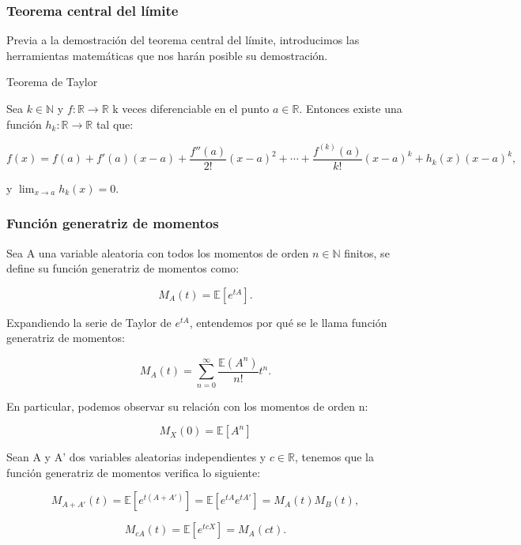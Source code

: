 \documentclass[../proyecto.tex]{memoir}
\begin{document}




\subsubsection{Teorema central del límite}

Previa a la demostración del teorema central del límite, introducimos las herramientas matemáticas que nos harán posible su demostración.

Teorema de Taylor

Sea $k \in \mathds{N}$ y $f: \mathds{R} \to \mathds{R}$ k veces diferenciable en el punto $a \in \mathds{R}$. Entonces existe una función $h_k: \mathds{R} \to \mathds{R}$ tal que:

$$
f(x)=f(a)+f'(a)(x-a)+\frac{f''(a)}{2!}(x-a)^2+\dotsb+\frac{f^{(k)}(a)}{k!}(x-a)^k + h_k(x)(x-a)^k,
$$

y $\lim_{x\to a} h_k(x) = 0$.
 
\subsubsection{Función generatriz de momentos}

Sea A una variable aleatoria con todos los momentos de orden $n\in\mathds{N}$ finitos, se define su función generatriz de momentos como:

$$
M_A(t)=\mathds{E}[e^{tA}].
$$

Expandiendo la serie de Taylor de $e^{tA}$, entendemos por qué se le llama función generatriz de momentos:

$$
M_A(t)=\sum_{n=0}^{\infty} \frac{\mathds{E}(A^n)}{n!}t^n.
$$

En particular, podemos observar su relación con los momentos de orden n:

$$
M_X(0)=\mathds{E}[A^n]
$$

Sean A y A' dos variables aleatorias independientes y $c \in \mathds{R}$, tenemos que la función generatriz de momentos verifica lo siguiente:

$$
M_{A+A'}(t)=\mathds{E}[e^{t(A+A')}]=\mathds{E}[e^{tA}e^{tA'}] = M_A(t)M_B(t),
$$

$$
M_{cA}(t)=\mathds{E}[e^{tcX}]=M_A(ct).
$$
\end{document}
